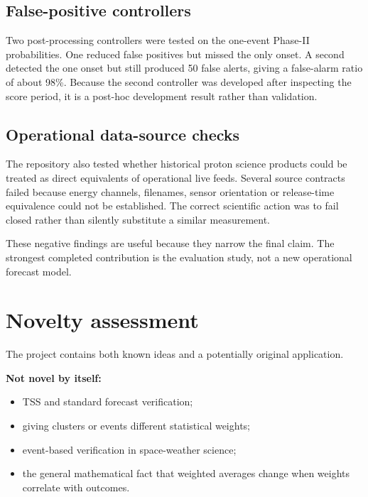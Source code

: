\documentclass[11pt]{article}
\begin{document}
\subsection{False-positive controllers}

Two post-processing controllers were tested on the one-event Phase-II probabilities. One reduced false positives but missed the only onset. A second detected the one onset but still produced 50 false alerts, giving a false-alarm ratio of about 98\%. Because the second controller was developed after inspecting the score period, it is a post-hoc development result rather than validation.

\subsection{Operational data-source checks}

The repository also tested whether historical proton science products could be treated as direct equivalents of operational live feeds. Several source contracts failed because energy channels, filenames, sensor orientation or release-time equivalence could not be established. The correct scientific action was to fail closed rather than silently substitute a similar measurement.

These negative findings are useful because they narrow the final claim. The strongest completed contribution is the evaluation study, not a new operational forecast model.

\section{Novelty assessment}

The project contains both known ideas and a potentially original application.

\textbf{Not novel by itself:}
\begin{itemize}
    \item TSS and standard forecast verification;
    \item giving clusters or events different statistical weights;
    \item event-based verification in space-weather science;
    \item the general mathematical fact that weighted averages change when weights correlate with outcomes.
\end{itemize}
\end{document}
